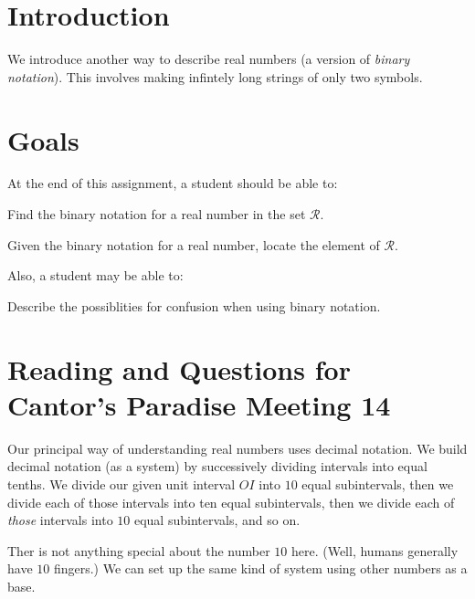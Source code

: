 \documentclass[12pt,letterpaper]{article}
\theoremstyle{definition}
\begin{document}
\setlength{\parskip}{1ex plus 0.5ex minus 0.2ex}
\setlength{\parindent}{0pt}

\pagestyle{fancy}
\cfoot{}

\section*{Introduction}
We introduce another way to describe real numbers (a version of \emph{binary notation}).
This involves making infintely long strings of only two symbols.

\section*{Goals}
At the end of this assignment, a student should be able to:
\begin{compactitem}
\item Find the binary notation for a real number in the set $\mathcal{R}$.
\item Given the binary notation for a real number, locate the element of $\mathcal{R}$.
\end{compactitem}
Also, a student may be able to:
\begin{compactitem}
\item Describe the possiblities for confusion when using binary notation.
\end{compactitem}

\section*{Reading and Questions for Cantor's Paradise Meeting 14}

Our principal way of understanding real numbers uses decimal notation.
We build decimal notation (as a system) by successively dividing intervals into equal tenths.
We divide our given unit interval $OI$ into $10$ equal subintervals, then we divide each of those intervals into ten equal subintervals, then we divide each of \emph{those} intervals into $10$ equal subintervals, and so on.


Ther is not anything special about the number $10$ here.
(Well, humans generally have $10$ fingers.)
We can set up the same kind of system using other numbers as a base.
\end{document}
